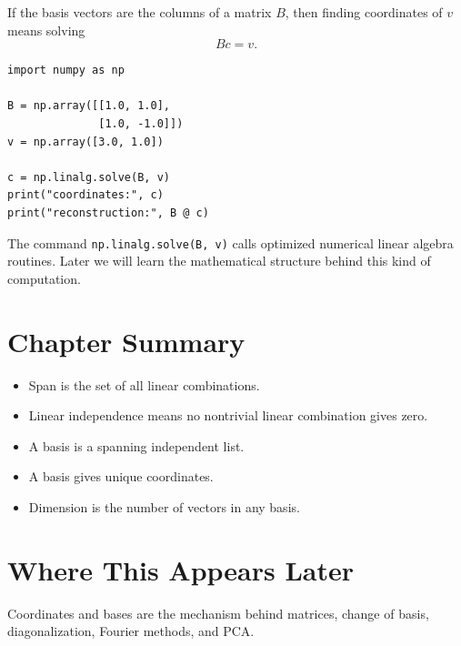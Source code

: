 If the basis vectors are the columns of a matrix $B$, then finding coordinates
of $v$ means solving
\[
  Bc=v.
\]

\begin{lstlisting}
import numpy as np

B = np.array([[1.0, 1.0],
              [1.0, -1.0]])
v = np.array([3.0, 1.0])

c = np.linalg.solve(B, v)
print("coordinates:", c)
print("reconstruction:", B @ c)
\end{lstlisting}

\begin{computebox}
The command \texttt{np.linalg.solve(B, v)} calls optimized numerical linear
algebra routines. Later we will learn the mathematical structure behind this
kind of computation.
\end{computebox}

\section*{Chapter Summary}

\begin{itemize}
  \item Span is the set of all linear combinations.
  \item Linear independence means no nontrivial linear combination gives zero.
  \item A basis is a spanning independent list.
  \item A basis gives unique coordinates.
  \item Dimension is the number of vectors in any basis.
\end{itemize}

\section*{Where This Appears Later}

Coordinates and bases are the mechanism behind matrices, change of basis,
diagonalization, Fourier methods, and PCA.


